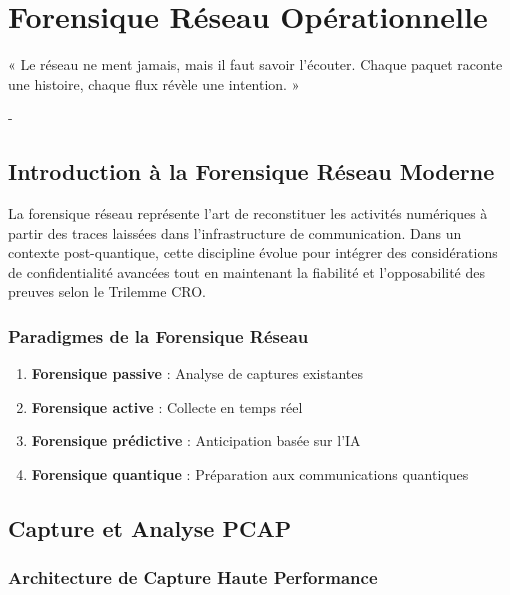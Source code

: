 \chapter{Forensique Réseau Opérationnelle}

\epigraph{« Le réseau ne ment jamais, mais il faut savoir l'écouter. Chaque paquet raconte une histoire, chaque flux révèle une intention. »}{- \hfill \textit{}}

\section{Introduction à la Forensique Réseau Moderne}

La forensique réseau représente l'art de reconstituer les activités numériques à partir des traces laissées dans l'infrastructure de communication. Dans un contexte post-quantique, cette discipline évolue pour intégrer des considérations de confidentialité avancées tout en maintenant la fiabilité et l'opposabilité des preuves selon le Trilemme CRO.

\subsection{Paradigmes de la Forensique Réseau}

\begin{enumerate}
\item \textbf{Forensique passive} : Analyse de captures existantes
\item \textbf{Forensique active} : Collecte en temps réel
\item \textbf{Forensique prédictive} : Anticipation basée sur l'IA
\item \textbf{Forensique quantique} : Préparation aux communications quantiques
\end{enumerate}

\section{Capture et Analyse PCAP}

\subsection{Architecture de Capture Haute Performance}

